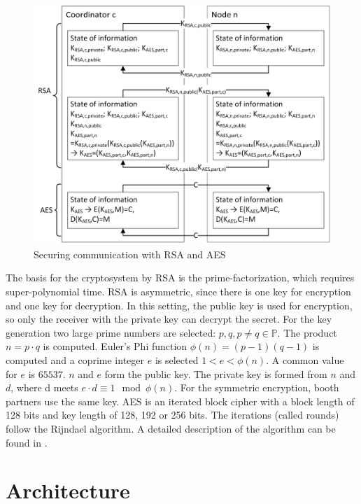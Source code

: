 	\begin{figure}[!htbp] %
		\caption{Securing communication with \gls{RSA} and \gls{AES}} \label{figure:RSA/AES scheme}
		\includegraphics[scale=1.0]{figures/encryption.png}
	\end{figure}
		
	The basis for the cryptosystem by \gls{RSA} is the prime-factorization, which requires super-polynomial time. \gls{RSA} is asymmetric, since there is one key for encryption and one key for decryption. In this setting, the public key is used for encryption, so only the receiver with the private key can decrypt the secret.
	For the key generation two large prime numbers are selected: $p,q,p\neq q \in \mathbb{P}$. The product $n=p\cdot q$ is computed. Euler's Phi function $\phi (n)=(p-1)(q-1)$ is computed and a coprime integer $e$ is selected $1<e<\phi(n)$. A common value for $e$ is $65537$. $n$ and $e$ form the public key.
	The private key is formed from $n$ and $d$, where d meets $e\cdot d\equiv 1\mod \phi(n)$.
	For the symmetric encryption, booth partners use the same key. \gls{AES} is an iterated block cipher with a block length of 128 bits and key length of 128, 192 or 256 bits. The iterations (called rounds) follow the Rijndael algorithm. A detailed description of the algorithm can be found in \textcite[pp. 20-25]{Delfs2015}.
	
	\FloatBarrier
	
	\section{Architecture} \label{Architecture}
	
